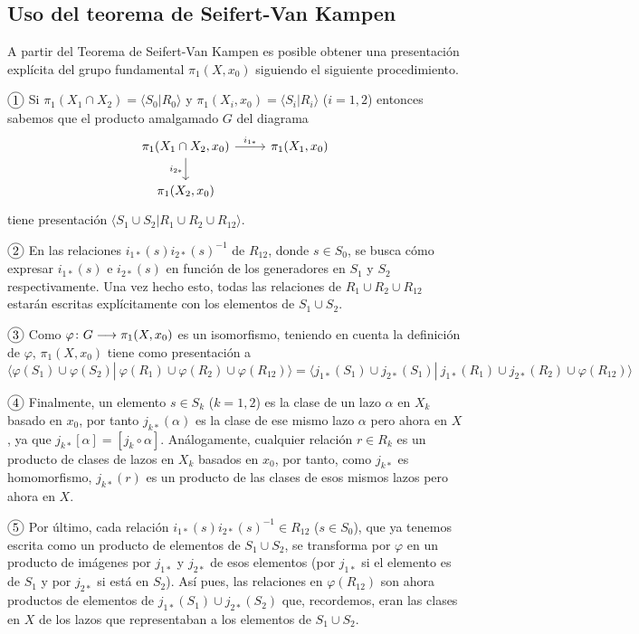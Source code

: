 \documentclass[GTSResumen.tex]{subfiles}
\begin{document}
\subsection{Uso del teorema de Seifert-Van Kampen}

A partir del Teorema de Seifert-Van Kampen es posible obtener una presentación explícita del grupo fundamental $\pi_1(X,x_0)$ siguiendo el siguiente procedimiento.

$\circled{1}$ Si $\pi_1(X_1\cap X_2)=\langle S_0|R_0\rangle$ y $\pi_1(X_i,x_0)=\langle S_i|R_i\rangle$ ($i=1,2$) entonces sabemos que el producto amalgamado $G$ del diagrama
\[
\begin{tikzcd}
\pi_1(X_1\cap X_2,x_0) \ar[r, "i_{1*}"]\arrow[d,"i_{2*} "'] & \pi_1(X_1,x_0)\\
\pi_1(X_2,x_0)
\end{tikzcd}
\]
tiene presentación $\langle S_1\cup S_2 | R_1\cup R_2\cup R_{12}\rangle$.

$\circled{2}$ En las relaciones $i_{1*}(s)i_{2*}(s)^{-1}$ de $R_{12}$, donde $s\in S_0$, se busca cómo expresar $i_{1*}(s)$ e $i_{2*}(s)$ en función de los generadores en $S_1$ y $S_2$ respectivamente. Una vez hecho esto, todas las relaciones de $R_1\cup R_2\cup R_{12}$ estarán escritas explícitamente con los elementos de $S_1\cup S_2$.

$\circled{3}$ Como $\varphi\colon{G}\longrightarrow{\pi_1(X,x_0)}$ es un isomorfismo, teniendo en cuenta la definición de $\varphi$, $\pi_1(X,x_0)$ tiene como presentación a
\[
\langle\varphi(S_1)\cup\varphi(S_2)|\ \varphi(R_1)\cup\varphi(R_2)\cup\varphi(R_{12})\rangle=\langle j_{1*}(S_1)\cup j_{2*}(S_1)|\ j_{1*}(R_1)\cup j_{2*}(R_2)\cup\varphi(R_{12})\rangle
\]

$\circled{4}$ Finalmente, un elemento $s\in S_k$ ($k=1,2$) es la clase de un lazo $\alpha$ en $X_k$ basado en $x_0$, por tanto $j_{k*}(\alpha)$ es la clase de ese mismo lazo $\alpha$ pero ahora en $X$, ya que  $j_{k*}[\alpha]=[j_k\circ\alpha]$. Análogamente, cualquier relación $r\in R_k$ es un producto de clases de lazos en $X_k$ basados en $x_0$, por tanto, como $j_{k*}$ es homomorfismo, $j_{k*}(r)$ es un producto de las clases de esos mismos lazos pero ahora en $X$.

$\circled{5}$ Por último, cada relación $i_{1*}(s)i_{2*}(s)^{-1}\in R_{12}$ ($s\in S_0$), que ya tenemos escrita como un producto de elementos de $S_1\cup S_2$, se transforma por $\varphi$ en un producto de imágenes por $j_{1*}$ y $j_{2*}$ de esos elementos (por $j_{1*}$ si el elemento es de $S_1$ y por $j_{2*}$ si está en $S_2$). Así pues, las relaciones en $\varphi(R_{12})$ son ahora productos de elementos de $j_{1*}(S_1)\cup j_{2*}(S_2)$ que, recordemos, eran las clases en $X$ de los lazos que representaban a los elementos de $S_1\cup S_2$.
\end{document}
